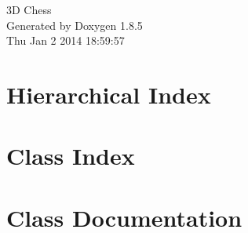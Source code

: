 \documentclass[twoside]{book}
\newcommand{\clearemptydoublepage}{%
  \newpage{\pagestyle{empty}\cleardoublepage}%
}
\begin{document}
\hypersetup{pageanchor=false}
\begin{titlepage}
\vspace*{7cm}
\begin{center}%
{\Large 3\-D Chess }\\
\vspace*{1cm}
{\large Generated by Doxygen 1.8.5}\\
\vspace*{0.5cm}
{\small Thu Jan 2 2014 18:59:57}\\
\end{center}
\end{titlepage}
\clearemptydoublepage
\tableofcontents
\clearemptydoublepage
{}
\hypersetup{pageanchor=true}

\chapter{Hierarchical Index}

\chapter{Class Index}

\chapter{Class Documentation}



































\newpage
{}
{}
\printindex
\end{document}
